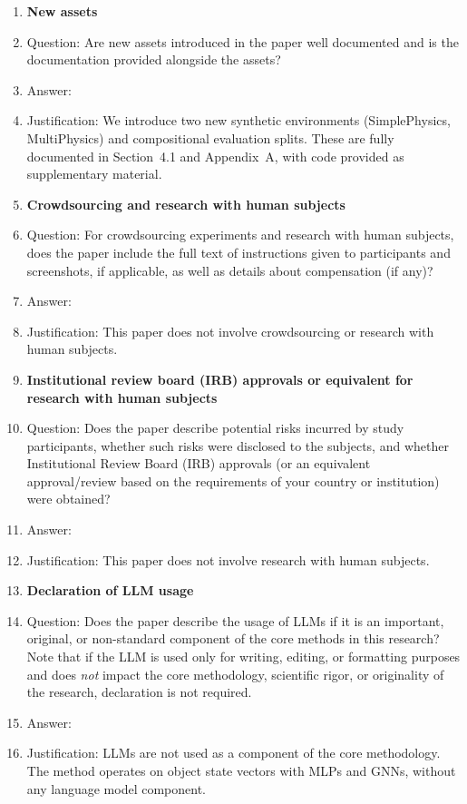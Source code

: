 \begin{enumerate}
\item {\bf New assets}
    \item[] Question: Are new assets introduced in the paper well documented and is the documentation provided alongside the assets?
    \item[] Answer: \answerYes{}
    \item[] Justification: We introduce two new synthetic environments (SimplePhysics, MultiPhysics) and compositional evaluation splits. These are fully documented in Section~4.1 and Appendix~A, with code provided as supplementary material.

\item {\bf Crowdsourcing and research with human subjects}
    \item[] Question: For crowdsourcing experiments and research with human subjects, does the paper include the full text of instructions given to participants and screenshots, if applicable, as well as details about compensation (if any)?
    \item[] Answer: \answerNA{}
    \item[] Justification: This paper does not involve crowdsourcing or research with human subjects.

\item {\bf Institutional review board (IRB) approvals or equivalent for research with human subjects}
    \item[] Question: Does the paper describe potential risks incurred by study participants, whether such risks were disclosed to the subjects, and whether Institutional Review Board (IRB) approvals (or an equivalent approval/review based on the requirements of your country or institution) were obtained?
    \item[] Answer: \answerNA{}
    \item[] Justification: This paper does not involve research with human subjects.

\item {\bf Declaration of LLM usage}
    \item[] Question: Does the paper describe the usage of LLMs if it is an important, original, or non-standard component of the core methods in this research? Note that if the LLM is used only for writing, editing, or formatting purposes and does \emph{not} impact the core methodology, scientific rigor, or originality of the research, declaration is not required.
    \item[] Answer: \answerNA{}
    \item[] Justification: LLMs are not used as a component of the core methodology. The method operates on object state vectors with MLPs and GNNs, without any language model component.

\end{enumerate}
